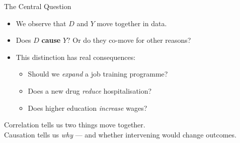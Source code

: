 \documentclass[aspectratio=169, 11pt]{beamer}
\begin{document}

\begin{frame}[t]{The Central Question}
\begin{itemize}
  \setlength\itemsep{0.6em}
  \item We observe that $D$ and $Y$ move together in data.
  \item Does $D$ \textbf{cause} $Y$? Or do they co-move for other reasons?
  \item This distinction has real consequences:
  \begin{itemize}
    \item Should we \emph{expand} a job training programme?
    \item Does a new drug \emph{reduce} hospitalisation?
    \item Does higher education \emph{increase} wages?
  \end{itemize}
\end{itemize}
\vspace{0.5em}
\begin{intuitionbox}
  Correlation tells us two things move together.\\
  Causation tells us \emph{why} — and whether intervening would change outcomes.
\end{intuitionbox}
\end{frame}
\end{document}
